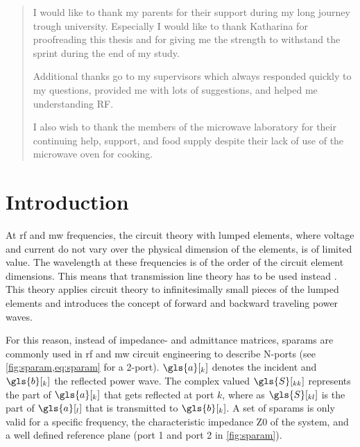 \documentclass[12pt,a4paper,parskip=full,abstract=true,BCOR=12mm]{scrreprt}
\begin{document}
\renewcommand{\abstractname}{Acknowledgements}
\begin{abstract}
    I would like to thank my parents for their support during my long journey
    trough university. Especially I would like to thank Katharina for proofreading
    this thesis and for giving me the strength to withstand the sprint during
    the end of my study.

    Additional thanks go to my supervisors which always responded quickly to
    my questions, provided me with lots of suggestions, and helped me
    understanding RF.

    I also wish to thank the members of the microwave laboratory for their
    continuing help, support, and food supply despite their lack of use of the
    microwave oven for cooking.
\end{abstract}

\tableofcontents
\cleardoublepage
\listoffigures
\printacronyms
\renewcommand*{\acronymfont}[1]{#1}
\printglossary[title={List of Symbols}]


\chapter{Introduction}
\label{chap:introduction}

At \gls{rf} and \gls{mw} frequencies, the circuit theory with lumped elements, where
voltage and current do not vary over the physical dimension of the elements, is of limited
value. The wavelength at these frequencies is of the order of the circuit
element dimensions. This means that transmission line theory has to be used instead \cite{pozar_mw_engineering_2011}.
This theory applies circuit theory to infinitesimally small pieces of the lumped elements
and introduces the concept of forward and backward traveling power waves.

For this reason, instead of impedance- and admittance matrices, \glspl{sparam}
are commonly used in \gls{rf} and \gls{mw} circuit engineering to describe
N-ports (see \cref{fig:sparam,eq:sparam} for a 2-port). $\gls{a}[_k]$ denotes the incident and
$\gls{b}[_k]$ the reflected power wave. The complex valued $\gls{S}[_{kk}]$ represents the
part of $\gls{a}[_k]$ that gets reflected at port $k$, where as $\gls{S}[_{kl}]$ is the part of $\gls{a}[_l]$ that
is transmitted to $\gls{b}[_k]$. A set of \glspl{sparam} is only valid for a specific frequency, the
characteristic impedance \gls{Z0} of the system, and a well defined reference plane (port 1 and port 2 in \cref{fig:sparam}).
\end{document}
